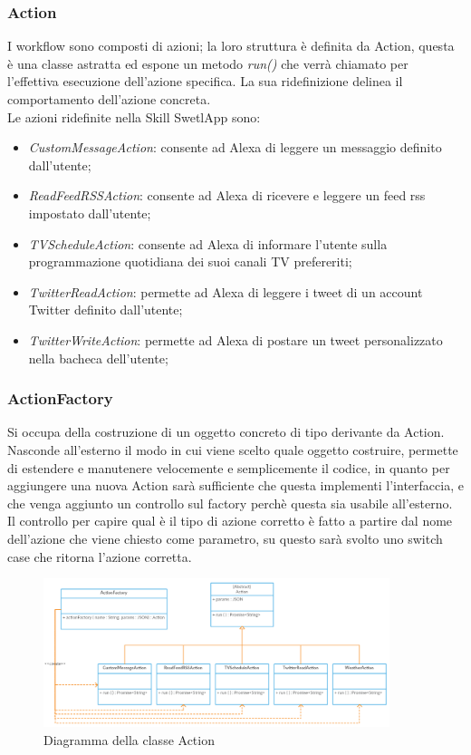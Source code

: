 \subsubsection{Action}
I workflow sono composti di azioni;
la loro struttura è definita da Action, questa è una classe astratta ed espone un metodo \textit{run()} che verrà chiamato per l'effettiva esecuzione dell'azione specifica.
La sua ridefinizione delinea il comportamento dell'azione concreta.\\
Le azioni ridefinite nella Skill SwetlApp sono:
\begin{itemize}
	\item \textit{CustomMessageAction}: consente ad Alexa di leggere un messaggio definito dall'utente;
	\item \textit{ReadFeedRSSAction}: consente ad Alexa di ricevere e leggere un feed rss impostato dall'utente;
	\item \textit{TVScheduleAction}: consente ad Alexa di informare l'utente sulla programmazione quotidiana dei suoi canali TV prefereriti;
	\item \textit{TwitterReadAction}: permette ad Alexa di leggere i tweet di un account Twitter definito dall'utente;
	\item \textit{TwitterWriteAction}: permette ad Alexa di postare un tweet personalizzato nella bacheca dell'utente;
\end{itemize}

\subsubsection{ActionFactory}
Si occupa della costruzione di un oggetto concreto di tipo derivante da Action.
Nasconde all'esterno il modo in cui viene scelto quale oggetto costruire, permette di estendere e manutenere velocemente e semplicemente il codice, in quanto per aggiungere una nuova Action sarà sufficiente che questa implementi l'interfaccia, e che venga aggiunto un controllo sul factory perchè questa sia usabile all'esterno.
Il controllo per capire qual è il tipo di azione corretto è fatto a partire dal nome dell'azione che viene chiesto come parametro, su questo sarà svolto uno switch case che ritorna l'azione corretta.

\begin{figure}[H]
	\begin{center}
		\includegraphics[width=0.9\textwidth, keepaspectratio]{../includes/pics/Factory Pattern.png}
		\caption{Diagramma della classe Action}
	\end{center}
\end{figure}


